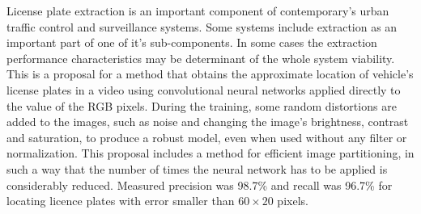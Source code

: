 
License plate extraction is an important component of contemporary's urban
traffic control and surveillance systems. 
Some systems include extraction as an important part of one of it's
sub-components.
In some cases the extraction performance characteristics may be determinant
of the whole system viability.
This is a proposal for a method that obtains the approximate location of
vehicle's license plates
in a video using convolutional neural networks applied directly to
the value of the RGB pixels. During the training, some random distortions are
added to the images, such as noise and changing the image's brightness,
contrast and saturation, to produce a robust model, even when used without any
filter or normalization. This proposal includes a method for efficient image
partitioning, in such a way that the number of times the neural network has to
be applied is considerably reduced. Measured precision was 98.7\% and
recall was 96.7\% for locating licence plates with error smaller than
$60 \times 20$ pixels.
